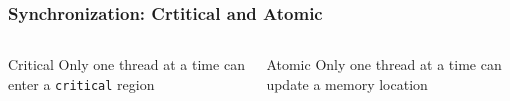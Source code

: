\documentclass[10pt,t]{beamer}
\begin{document}
\begin{frame}
  \frametitle{Synchronization: Crtitical and Atomic}
  \begin{columns}
    \begin{exampleblock}{Critical}
      Only one thread at a time can enter a \texttt{critical} region
      
    \end{exampleblock}
    \begin{exampleblock}{Atomic}
      Only one thread at a time can update a memory location
      
    \end{exampleblock}  
  \end{columns}
\end{frame}
\end{document}
